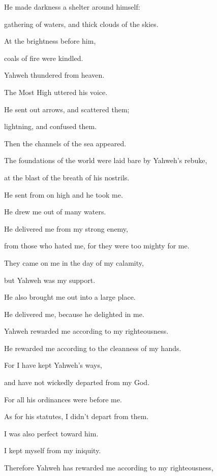 {\par }{\Q {}He made darkness a shelter around himself:
\par }{\QB gathering of waters, and thick clouds of the skies.
\par }{\Q {}At the brightness before him,
\par }{\QB coals of fire were kindled.
\par }{\Q {}Yahweh thundered from heaven.
\par }{\QB The Most High uttered his voice.
\par }{\Q {}He sent out arrows, and scattered them;
\par }{\QB lightning, and confused them.
\par }{\Q {}Then the channels of the sea appeared.
\par }{\QB The foundations of the world were laid bare by Yahweh’s rebuke,
\par }{\QB at the blast of the breath of his nostrils.
\par }{\Q {}He sent from on high and he took me.
\par }{\QB He drew me out of many waters.
\par }{\Q {}He delivered me from my strong enemy,
\par }{\QB from those who hated me, for they were too mighty for me.
\par }{\Q {}They came on me in the day of my calamity,
\par }{\QB but Yahweh was my support.
\par }{\Q {}He also brought me out into a large place.
\par }{\QB He delivered me, because he delighted in me.
\par }{\Q {}Yahweh rewarded me according to my righteousness.
\par }{\QB He rewarded me according to the cleanness of my hands.
\par }{\Q {}For I have kept Yahweh’s ways,
\par }{\QB and have not wickedly departed from my God.
\par }{\Q {}For all his ordinances were before me.
\par }{\QB As for his statutes, I didn’t depart from them.
\par }{\Q {}I was also perfect toward him.
\par }{\QB I kept myself from my iniquity.
\par }{\Q {}Therefore Yahweh has rewarded me according to my righteousness,
}
